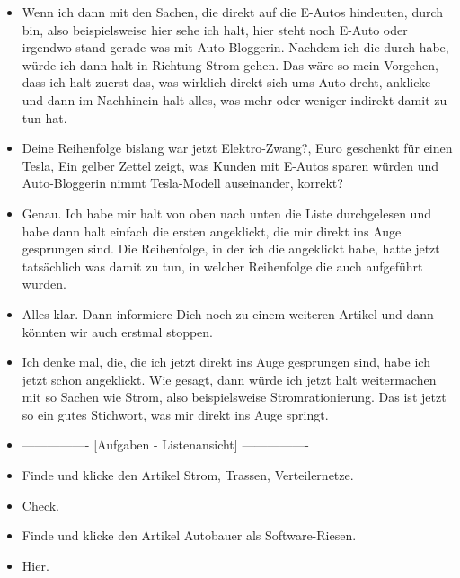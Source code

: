 {\begin{itemize}[]
                  Und deswegen würde ich jetzt nicht nach irgendwelchen speziellen Themen Ausschau halten, sondern einfach alles, was damit zu tun hat.
            \item {} Wenn ich dann mit den Sachen, die direkt auf die E-Autos hindeuten, durch bin, also beispielsweise hier sehe ich halt, hier steht noch E-Auto oder irgendwo stand gerade was mit Auto Bloggerin.
                  Nachdem ich die durch habe, würde ich dann halt in Richtung Strom gehen.
                  Das wäre so mein Vorgehen, dass ich halt zuerst das, was wirklich direkt sich ums Auto dreht, anklicke und dann im Nachhinein halt alles, was mehr oder weniger indirekt damit zu tun hat.
            \item {} Deine Reihenfolge bislang war jetzt \flqq Elektro-Zwang?\frqq{},  Euro geschenkt für einen Tesla\frqq{}, \flqq Ein gelber Zettel zeigt, was Kunden mit E-Autos sparen würden\frqq{} und \flqq Auto-Bloggerin nimmt Tesla-Modell auseinander\frqq{}, korrekt?
            \item {} Genau.
                  Ich habe mir halt von oben nach unten die Liste durchgelesen und habe dann halt einfach die ersten angeklickt, die mir direkt ins Auge gesprungen sind.
                  Die Reihenfolge, in der ich die angeklickt habe, hatte jetzt tatsächlich was damit zu tun, in welcher Reihenfolge die auch aufgeführt wurden.
            \item {} Alles klar. Dann informiere Dich noch zu einem weiteren Artikel und dann könnten wir auch erstmal stoppen.
            \item {} Ich denke mal, die, die ich jetzt direkt ins Auge gesprungen sind, habe ich jetzt schon angeklickt.
                  Wie gesagt, dann würde ich jetzt halt weitermachen mit so Sachen wie Strom, also beispielsweise \flqq Stromrationierung\frqq{}.
                  Das ist jetzt so ein gutes Stichwort, was mir direkt ins Auge springt.
            \item {----------------} [Aufgaben - Listenansicht] {----------------}
            \item {} Finde und klicke den Artikel \flqq Strom, Trassen, Verteilernetze\frqq{}.
            \item {} Check.
            \item {} Finde und klicke den Artikel \flqq Autobauer als Software-Riesen\frqq{}.
            \item {} Hier.

\end{itemize}}
